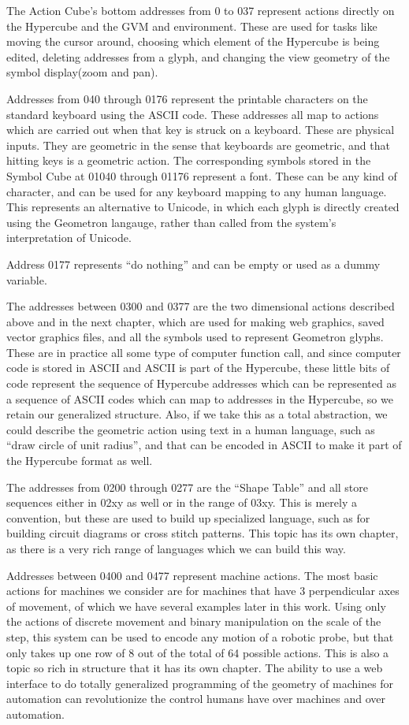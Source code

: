 The Action Cube's bottom addresses from 0 to 037 represent actions directly on the Hypercube and the GVM and environment. These are used for tasks like moving the cursor around, choosing which element of the Hypercube is being edited, deleting addresses from a glyph, and changing the view geometry of the symbol display(zoom and pan).

Addresses from 040 through 0176 represent the printable characters on the standard keyboard using the ASCII code.  These addresses all map to actions which are carried out when that key is struck on a keyboard.  These are physical inputs.  They are geometric in the sense that keyboards are geometric, and that hitting keys is a geometric action.  The corresponding symbols stored in the Symbol Cube at 01040 through 01176 represent a font.  These can be any kind of character, and can be used for any keyboard mapping to any human language.  This represents an alternative to Unicode, in which each glyph is directly created using the Geometron langauge, rather than called from the system's interpretation of Unicode.

Address 0177 represents ``do nothing'' and can be empty or used as a dummy variable.

The addresses between 0300 and 0377 are the two dimensional actions described above and in the next chapter, which are used for making web graphics, saved vector graphics files, and all the symbols used to represent Geometron glyphs.  These are in practice all some type of computer function call, and since computer code is stored in ASCII and ASCII is part of the Hypercube, these little bits of code represent the sequence of Hypercube addresses which can be represented as a sequence of ASCII codes which can map to addresses in the Hypercube, so we retain our generalized structure. Also, if we take this as a total abstraction, we could describe the geometric action using text in a human language, such as ``draw circle of unit radius'', and that can be encoded in ASCII to make it part of the Hypercube format as well. 

The addresses from 0200 through 0277 are the ``Shape Table'' and all store sequences either in 02xy as well or in the range of 03xy.  This is merely a convention, but these are used to build up specialized language, such as for building circuit diagrams or cross stitch patterns.  This topic has its own chapter, as there is a very rich range of languages which we can build this way.

Addresses between 0400 and 0477 represent machine actions.  The most basic actions for machines we consider are for machines that have 3 perpendicular axes of movement, of which we have several examples later in this work.  Using only the actions of discrete movement and binary manipulation on the scale of the step, this system can be used to encode any motion of a robotic probe, but that only takes up one row of 8 out of the total of 64 possible actions.  This is also a topic so rich in structure that it has its own chapter.  The ability to use a web interface to do totally generalized programming of the geometry of machines for automation can revolutionize the control humans have over machines and over automation.  

